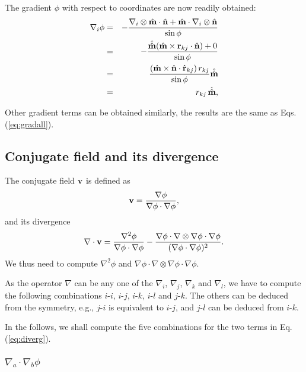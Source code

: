 \documentclass{article}
\begin{document}
The gradient $\phi$ with respect to coordinates are now readily obtained:
\begin{eqnarray*}
\nabla_i \phi &=& -\frac{ \nabla_i \otimes \hat{\mathbf{m}} \cdot \hat{\mathbf{n}}  + \hat{\mathbf{m}} \cdot \nabla_i \otimes \hat{\mathbf{n}} }
                  {\sin \phi} \\
              &=& -\frac{ \hat{\hat{\mathbf{m}}} (\hat{\mathbf{m}} \times \mathbf{r}_{kj} \cdot \hat{\mathbf{n}}) + 0 }
                  {\sin \phi} \\
              &=& \frac{ (\hat{\mathbf{m}} \times \hat{\mathbf{n}} \cdot \hat{\mathbf{r}}_{kj}) \, r_{kj} }
                  {\sin \phi} \hat{\hat{\mathbf{m}}} \\
              &=& r_{kj} \, \hat{\hat{\mathbf{m}}},
\end{eqnarray*}

Other gradient terms can be obtained similarly, the results are the same as Eqs. (\ref{eq:gradall}).




\subsection{Conjugate field and its divergence}


The conjugate field $\mathbf{v}$ is defined as
\begin{equation}
\mathbf{v} = \frac {\nabla \phi} {\nabla \phi \cdot \nabla \phi},
\end{equation}
and its divergence
\begin{equation}
\nabla \cdot \mathbf{v}  = 
   \frac {\nabla^2 \phi} 
         {\nabla \phi \cdot \nabla \phi}
 - \frac {\nabla \phi \cdot \nabla \otimes \nabla \phi \cdot \nabla \phi} 
         {(\nabla \phi \cdot \nabla \phi)^2}.
\label{eq:diverg}
\end{equation}
%
We thus need to compute 
$\nabla^2 \phi$
and
$\nabla \phi \cdot \nabla \otimes \nabla \phi \cdot \nabla \phi$.


As the operator $\nabla$ can be any one of the 
$\nabla_i$, $\nabla_j$, $\nabla_k$ and $\nabla_l$,
we have to compute the following combinations 
$i$-$i$, $i$-$j$, $i$-$k$, $i$-$l$ and $j$-$k$.
%
The others can be deduced from the symmetry, 
e.g., 
$j$-$i$ is equivalent to $i$-$j$, and
$j$-$l$ can be deduced from $i$-$k$.

In the follows, we shall compute the five combinations for the two terms in 
Eq. (\ref{eq:diverg}).

\subsubsection{$\nabla_a \cdot \nabla_b \phi$}
\end{document}
